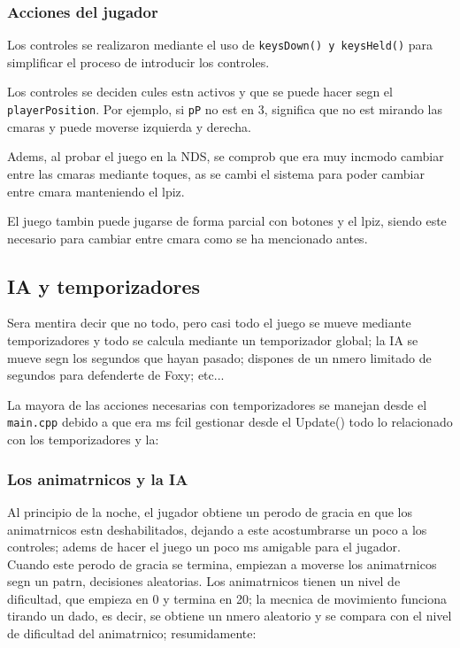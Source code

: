 \documentclass[12pt]{article}
\begin{document}
  \subsubsection{Acciones del jugador}
    Los controles se realizaron mediante el uso de \texttt{keysDown() y keysHeld()} para simplificar el proceso de introducir los controles.

    Los controles se deciden cules estn activos y que se puede hacer segn el \texttt{playerPosition}. Por ejemplo, si \texttt{pP} no est en 3, significa que no est mirando las cmaras y puede moverse izquierda y derecha.

    Adems, al probar el juego en la NDS, se comprob que era muy incmodo cambiar entre las cmaras mediante toques, as se cambi el sistema para poder cambiar entre cmara manteniendo el lpiz.

    El juego tambin puede jugarse de forma parcial con botones y el lpiz, siendo este necesario para cambiar entre cmara como se ha mencionado antes.

  \subsection{IA y temporizadores}
    Sera mentira decir que no todo, pero casi todo el juego se mueve mediante temporizadores y todo se calcula mediante un temporizador global; la IA se mueve segn los segundos que hayan pasado; dispones de un nmero limitado de segundos para defenderte de Foxy; etc...

    La mayora de las acciones necesarias con temporizadores se manejan desde el \texttt{main.cpp} debido a que era ms fcil gestionar desde el Update() todo lo relacionado con los temporizadores y la:
    \subsubsection{Los animatrnicos y la IA}
      Al principio de la noche, el jugador obtiene un perodo de gracia en que los animatrnicos estn deshabilitados, dejando a este acostumbrarse un poco a los controles; adems de hacer el juego un poco ms amigable para el jugador.\\

      Cuando este perodo de gracia se termina, empiezan a moverse los animatrnicos segn un patrn, decisiones aleatorias.
      Los animatrnicos tienen un nivel de dificultad, que empieza en 0 y termina en 20; la mecnica de movimiento funciona tirando un dado, es decir, se obtiene un nmero aleatorio y se compara con el nivel de dificultad del animatrnico; resumidamente:
\end{document}
